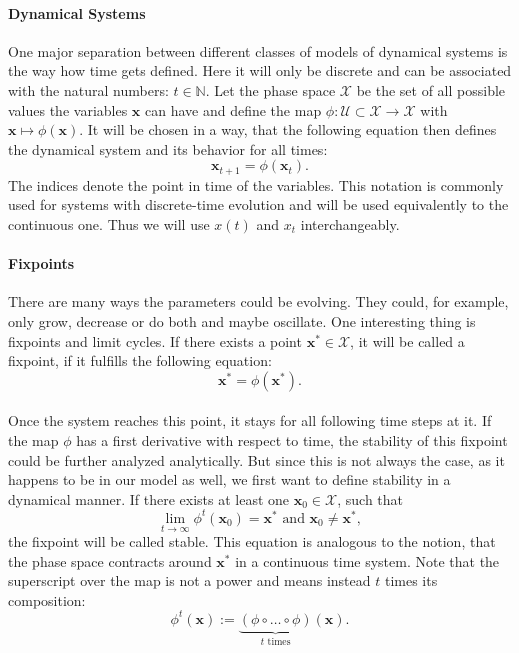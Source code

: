 \paragraph*{Dynamical Systems}
One major separation between different classes of models of dynamical systems is the way how time gets defined. Here it will only be discrete and can be associated with the natural numbers: $ t \in \mathbb{N} $. Let the phase space $ \mathcal{X} $ be the set of all possible values the variables $ \boldsymbol{x} $ can have and define the map $ \phi :  \mathcal{U}\subset\mathcal{X} \longrightarrow \mathcal{X} $ with $ \boldsymbol{x} \mapsto \phi (\boldsymbol{x}) $. It will be chosen in a way, that the following equation then defines the dynamical system and its behavior for all times:
\begin{equation}
\boldsymbol{x}_{t+1} = \phi(\boldsymbol{x}_t).
\end{equation} 
The indices denote the point in time of the variables. This notation is commonly used for systems with discrete-time evolution and will be used equivalently to the continuous one. Thus we will use $ x(t) $ and $ x_t$ interchangeably.

\paragraph*{Fixpoints}
There are many ways the parameters could be evolving. They could, for example, only grow, decrease or do both and maybe oscillate. One interesting thing is fixpoints and limit cycles. If there exists a point $ \boldsymbol{x}^*\in \mathcal{X} $, it will be called a fixpoint, if it fulfills the following equation:
\begin{equation}\label{eq:fixpoint}
\boldsymbol{x}^*=\phi(\boldsymbol{x}^*).
\end{equation}

\paragraph*{}
Once the system reaches this point, it stays for all following time steps at it. If the map $ \phi $ has a first derivative with respect to time, the stability of this fixpoint could be further analyzed analytically. But since this is not always the case, as it happens to be in our model as well, we first want to define stability in a dynamical manner. If there exists at least one $ \boldsymbol{x}_0\in \mathcal{X} $, such that 
\begin{equation}\label{eq:stable_fixpoint}
\lim\limits_{t\rightarrow \infty} \phi^t (\boldsymbol{x}_0) = \boldsymbol{x}^*\text{ and } \boldsymbol{x}_0 \neq \boldsymbol{x}^*,
\end{equation}
the fixpoint will be called stable. This equation is analogous to the notion, that the phase space contracts around $ \boldsymbol{x}^* $ in a continuous time system. Note that the superscript over the map is not a power and means instead $ t $ times its composition:
\begin{equation}
\phi^t (\boldsymbol{x}) := \underbrace{(\phi \circ\dots\circ\phi)}_{t\text{ times}}(\boldsymbol{x}).
\end{equation}

